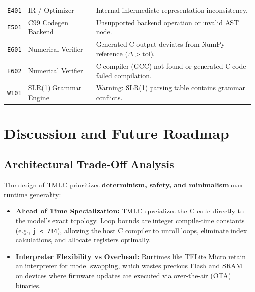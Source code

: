 \documentclass[11pt,a4paper]{article}
\begin{document}
\begin{table}[htbp]
\begin{tabular}{llp{9.2cm}}
\texttt{E401} & IR / Optimizer             & Internal intermediate representation inconsistency. \\
\texttt{E501} & C99 Codegen Backend        & Unsupported backend operation or invalid AST node. \\
\texttt{E601} & Numerical Verifier         & Generated C output deviates from NumPy reference ($\Delta > \text{tol}$). \\
\texttt{E602} & Numerical Verifier         & C compiler (GCC) not found or generated C code failed compilation. \\
\texttt{W101} & SLR(1) Grammar Engine      & Warning: SLR(1) parsing table contains grammar conflicts. \\
\bottomrule
\end{tabular}
\end{table}

\section{Discussion and Future Roadmap}
\label{sec:comparative_eval}

\subsection{Architectural Trade-Off Analysis}
The design of TMLC prioritizes \textbf{determinism, safety, and minimalism} over runtime generality:
\begin{itemize}[leftmargin=*]
    \item \textbf{Ahead-of-Time Specialization:} TMLC specializes the C code directly to the model's exact topology. Loop bounds are integer compile-time constants (e.g., \texttt{j < 784}), allowing the host C compiler to unroll loops, eliminate index calculations, and allocate registers optimally.
    \item \textbf{Interpreter Flexibility vs Overhead:} Runtimes like TFLite Micro retain an interpreter for model swapping, which wastes precious Flash and SRAM on devices where firmware updates are executed via over-the-air (OTA) binaries.
\end{itemize}
\end{document}
